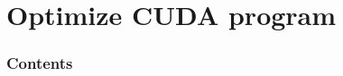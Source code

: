 \documentclass[dvipdfmx, 11pt, aspectratio=169]{beamer}   %
\begin{document}



\section{Optimize CUDA program}
\begin{frame}
    \frametitle{Contents}
    \linespread{0.6}\selectfont
\end{frame}
\end{document}
